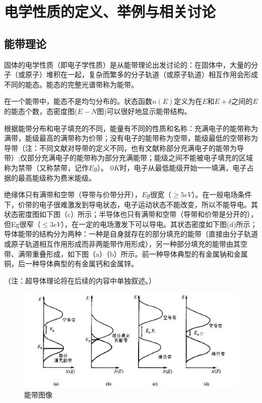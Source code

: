 
\chapter{电学性质的定义、举例与相关讨论}

\section{能带理论}

固体的电学性质（即电子学性质）是从能带理论出发讨论的：在固体中，大量的分子（或原子）堆积在一起，复杂而繁多的分子轨道（或原子轨道）相互作用会形成不同的能态。能态的完整光谱带称为能带。

在一个能带中，能态不是均匀分布的。状态函数$n(E)$定义为在$E$和$E+\delta$之间的$E$的能态个数，态密度图($E-N$图)可以很好地显示能带结构。

根据能带分布和电子填充的不同，能量有不同的性质和名称：充满电子的能带称为满带，能级最高的满带称为价带；没有电子的能带称为空带，能级最低的空带称为导带（注：不同文献对导带的定义不同，也有文献称部分充满电子的能带为导带）;仅部分充满电子的能带称为部分充满能带；能级之间不能被电子填充的区域称为禁带（又称禁带，记作$Eg$）。 $0K$时，电子从最低能级开始一一填满，电子占据的最高能级称为费米能级。

绝缘体只有满带和空带（导带与价带分开），$Eg$很宽（$\geq 5eV$）。在一般电场条件下，价带的电子很难激发到导电状态，电子运动状态不能改变，所以不能导电。其状态密度图如下图（c）所示；半导体也只有满带和空带（导带和价带是分开的），但Eg很窄（$\leq 3eV$），在一定的电场激发下可以导电。其状态密度如下图(d)所示；导体能带的结构分为两种：一种是自身就存在的部分填充的能带（直接由分子轨道或原子轨道相互作用形成而非两能带作用形成），另一种部分填充的能带由其空带、满带重叠形成，如下图（a）（b）所示。前一种导体典型的有金属钠和金属铜，后一种导体典型的有金属钙和金属锌。

（注：超导体理论将在后续的内容中单独叙述。）
\begin{figure}
    \centering
    \includegraphics[scale=0.3]{img/能带.png}
    \caption{能带图像}
\end{figure}

